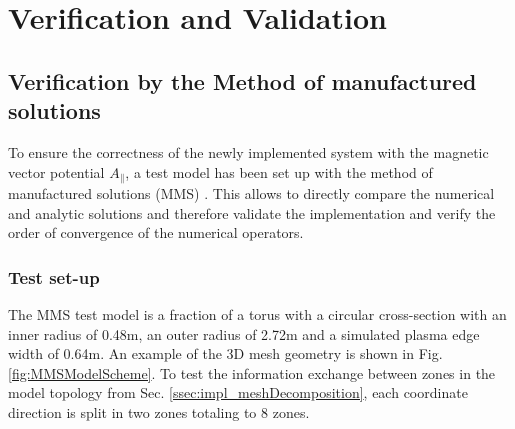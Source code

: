 \chapter{Verification and Validation}
\section{Verification by the Method of manufactured solutions}
To ensure the correctness of the newly implemented system with the magnetic vector potential $A_\parallel$, a test model has been set up with the method of manufactured solutions (MMS) \cite{ManufacturedSolution}. This allows to directly compare the numerical and analytic solutions and therefore validate the implementation and verify the order of convergence of the numerical operators. 

\subsection{Test set-up}
The MMS test model is a fraction of a torus with a circular cross-section with an inner radius of 0.48m, an outer radius of 2.72m and a simulated plasma edge width of 0.64m. An example of the 3D mesh geometry is shown in Fig. \ref{fig:MMSModelScheme}. To test the information exchange between zones in the model topology from Sec. \ref{ssec:impl_meshDecomposition}, each coordinate direction is split in two zones totaling to 8 zones.

